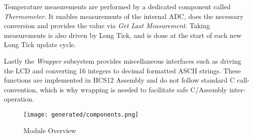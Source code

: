 Temperature measurements are performed by a dedicated component called \emph{Thermometer}. It enables measurements of the internal ADC, does the necessary conversion and provides the value via \emph{Get Last Measurement}. Taking measurements is also driven by Long Tick, and is done at the start of each new Long Tick update cycle.

Lastly the \emph{Wrapper} subsystem provides miscellaneous interfaces such as driving the LCD and converting \SI{16}{\bit} integers to decimal formatted ASCII strings. These functions are implemented in HCS12 Assembly and do not follow standard C call-convention, which is why wrapping is needed to facilitate safe C/Assembly inter-operation.

\begin{figure}
    \centering
    \texttt{[image: generated/components.png]}
    \caption{Module Overview}\label{fig:module_overview}
\end{figure}
